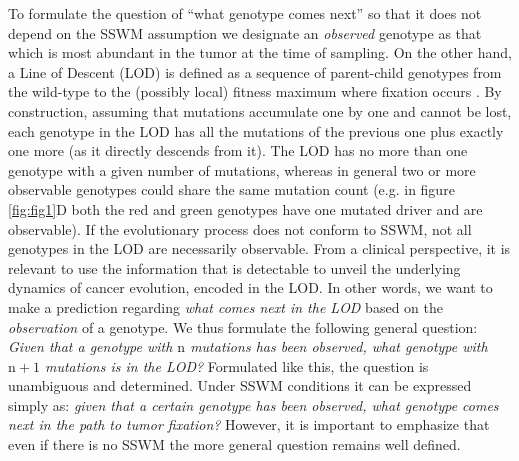 \documentclass[a4paper,10pt]{article}
\begin{document}
To formulate the question of ``what genotype comes next'' 
so that it does not depend on the SSWM assumption we designate an
\textit{observed} genotype as that which is most abundant in the tumor at
the time of sampling. On the other hand, a Line of Descent (LOD) is
defined as a sequence of parent-child genotypes from the wild-type to the
(possibly local) 
fitness maximum where fixation occurs \cite{szendro_predictability_2013}.
By construction, assuming that mutations accumulate one by one and cannot
be lost, each genotype in the LOD has all the mutations of the previous
one plus exactly one more (as it directly descends from it). The LOD has
no more than one genotype with a given number of mutations, whereas in
general two or more observable genotypes could share the same mutation
count (e.g. in figure \ref{fig:fig1}D both the red and green genotypes
have one mutated driver and are observable). If the evolutionary process
does not conform to SSWM, not all genotypes in the LOD are necessarily
observable. From a clinical perspective, it is relevant to use the
information that is detectable to unveil the underlying dynamics of cancer
evolution, encoded in the LOD. In other words, we want to make a
prediction regarding \textit{what comes next in the LOD} based on the
\textit{observation} of a genotype. We thus formulate the following
general question: \textit{Given that a genotype with $\mathrm{n}$
  mutations has been observed, what genotype with $\mathrm{n}+1$ mutations
  is in the LOD?} Formulated like this, the question is unambiguous and
determined. Under SSWM conditions it can be expressed simply as:
\textit{given that a certain genotype has been observed, what genotype
  comes next in the path to tumor fixation?} However, it is important to
emphasize that even if there is no SSWM the more general question remains
well defined.

\end{document}
